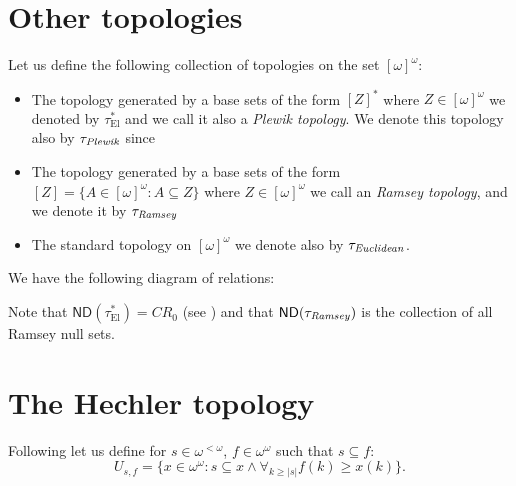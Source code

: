 \documentclass[12pt]{amsart}
\theoremstyle{plain}
\theoremstyle{definition}
\theoremstyle{remark}
\newcommand{\baire}{\omega^{\omega}}
\newcommand{\finbaire}{\omega^{<\omega}}
\newcommand{\infsub}{[\omega]^{\omega}}
\newcommand{\ND}{\mathsf{ND}}
\newcommand{\EllentuckTopology}{\tau_\mathrm{El}}
\newcommand{\EllentuckTopologyStar}{\EllentuckTopology^*}
\newcommand{\Hechler}[2]{U_{#1,#2}}
\begin{document}
\section{Other topologies}

Let us define the following collection of
topologies on the set $\infsub$:

\begin{itemize}

\item
  The topology generated by a base sets of the form $[Z]^*$
  where $Z \in\infsub$ we denoted by $\EllentuckTopologyStar$
  and we call it also a {\it Plewik topology}. We denote
  this topology also by  $\tau_{\mathit{\tiny Plewik}}$
  since 

\item
  The topology generated by a base sets of the form
  $[Z] = \lbrace A \in \infsub \colon A \subseteq Z \rbrace$
  where $Z \in\infsub$ we call an {\it Ramsey topology},
  and we denote it by $\tau_{\mathit{\tiny Ramsey}}$
\item
  The standard topology on $\infsub$ we denote also
  by  $\tau_{\mathit{\tiny Euclidean}}$.
\end{itemize}

We have the following diagram of relations:


Note that $\ND(\EllentuckTopologyStar) = CR_0$ (see \cite{Plewik1987})
and that $\ND(\tau_{\mathit{\tiny Ramsey}})$ is the collection
of all Ramsey null sets. 

\section{The Hechler topology}

Following \cite{LabedzkiRepicky1995} let us define for $s \in \finbaire$,
$f \in \baire$ such that $s \subseteq f$:
\[
  \Hechler{s}{f} = \lbrace x \in \baire\colon s \subseteq x \wedge \forall_{k \geq |s|} f(k) \geq x(k)\rbrace.
\]
\end{document}
